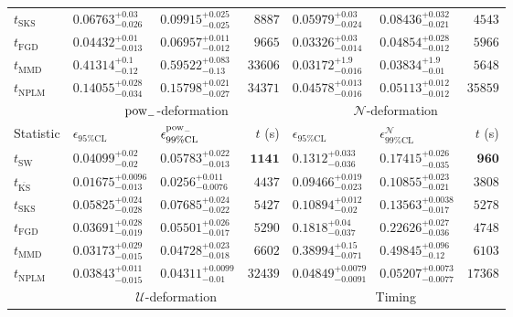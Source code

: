 \begin{tabular}{l|llr|llr}
	$t_{\mathrm{SKS}}$ & $0.06763_{-0.026}^{+0.03}$ & $0.09915_{-0.025}^{+0.025}$ & $8887$ & $0.05979_{-0.024}^{+0.03}$ & $0.08436_{-0.021}^{+0.032}$ & $4543$ \\
	$t_{\mathrm{FGD}}$ & ${\mathbf{0.04432_{-0.013}^{+0.01}}}$ & ${\mathbf{0.06957_{-0.012}^{+0.011}}}$ & $9665$ & $0.03326_{-0.014}^{+0.03}$ & $0.04854_{-0.012}^{+0.028}$ & $5966$ \\
	$t_{\mathrm{MMD}}$ & $0.41314_{-0.12}^{+0.1}$ & $0.59522_{-0.13}^{+0.083}$ & $33606$ & $0.03172_{-0.016}^{+1.9}$ & $0.03834_{-0.01}^{+1.9}$ & $5648$ \\
\rowcolor{red!35}	$t_{\mathrm{NPLM}}$ & $0.14055_{-0.034}^{+0.028}$ & $0.15798_{-0.027}^{+0.021}$ & $34371$ & $0.04578_{-0.016}^{+0.013}$ & $0.05113_{-0.012}^{+0.012}$ & $35859$ \\
	\toprule
	\multicolumn{1}{c}{} & \multicolumn{3}{c}{$\rm{pow}_{-}$-deformation} & \multicolumn{3}{c}{$\mathcal{N}$-deformation} \\
	Statistic & $\epsilon_{95\%\mathrm{CL}}$ & $\epsilon^  {\rm{pow}_{-}}_{99\%\mathrm{CL}}$ & $t$ (s) & $\epsilon_{95\%\mathrm{CL}}$ & $\epsilon^    {\mathcal{N}}_{99\%\mathrm{CL}}$ & $t$ (s) \\
	\midrule
	$t_{\mathrm{SW}}$ & $0.04099_{-0.02}^{+0.02}$ & $0.05783_{-0.013}^{+0.022}$ & ${\mathbf{1141}}$ & $0.1312_{-0.036}^{+0.033}$ & $0.17415_{-0.035}^{+0.026}$ & ${\mathbf{960}}$ \\
	$t_{\overline{\mathrm{KS}}}$ & ${\mathbf{0.01675_{-0.013}^{+0.0096}}}$ & ${\mathbf{0.0256_{-0.0076}^{+0.011}}}$ & $4437$ & ${\mathbf{0.09466_{-0.023}^{+0.019}}}$ & ${\mathbf{0.10855_{-0.021}^{+0.023}}}$ & $3808$ \\
	$t_{\mathrm{SKS}}$ & $0.05825_{-0.028}^{+0.024}$ & $0.07685_{-0.022}^{+0.024}$ & $5427$ & $0.10894_{-0.02}^{+0.012}$ & $0.13563_{-0.017}^{+0.0038}$ & $5278$ \\
	$t_{\mathrm{FGD}}$ & $0.03691_{-0.019}^{+0.028}$ & $0.05501_{-0.017}^{+0.026}$ & $5290$ & $0.1818_{-0.037}^{+0.04}$ & $0.22626_{-0.036}^{+0.027}$ & $4748$ \\
	$t_{\mathrm{MMD}}$ & $0.03173_{-0.015}^{+0.029}$ & $0.04728_{-0.018}^{+0.023}$ & $6602$ & $0.38994_{-0.071}^{+0.15}$ & $0.49845_{-0.12}^{+0.096}$ & $6103$ \\
\rowcolor{red!35}	$t_{\mathrm{NPLM}}$ & $0.03843_{-0.015}^{+0.011}$ & $0.04311_{-0.01}^{+0.0099}$ & $32439$ & $0.04849_{-0.0091}^{+0.0079}$ & $0.05207_{-0.0077}^{+0.0073}$ & $17368$ \\
	\toprule
	\multicolumn{1}{c}{} & \multicolumn{3}{c}{$\mathcal{U}$-deformation} & \multicolumn{3}{c}{Timing} \\

\end{tabular}
